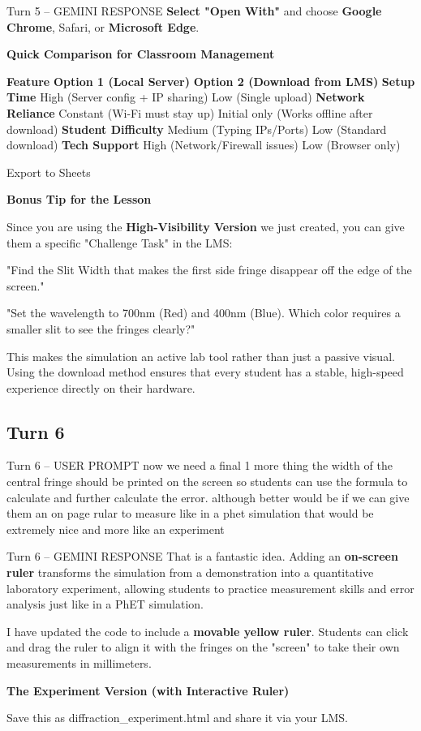 \documentclass[10pt,a4paper]{article}
\begin{document}
\begin{aibox}{Turn 5 -- GEMINI RESPONSE}
\textbf{Select "Open With"} and choose \textbf{Google Chrome}, Safari, or \textbf{Microsoft Edge}.

\textbf{\large Quick Comparison for Classroom Management}

\textbf{Feature}	\textbf{Option 1 (Local Server)}	\textbf{Option 2 (Download from LMS)}
\textbf{Setup Time}	High (Server config + IP sharing)	Low (Single upload)
\textbf{Network Reliance}	Constant (Wi-Fi must stay up)	Initial only (Works offline after download)
\textbf{Student Difficulty}	Medium (Typing IPs/Ports)	Low (Standard download)
\textbf{Tech Support}	High (Network/Firewall issues)	Low (Browser only)

Export to Sheets

\textbf{\large Bonus Tip for the Lesson}

Since you are using the \textbf{High-Visibility Version} we just created, you can give them a specific "Challenge Task" in the LMS:

"Find the Slit Width that makes the first side fringe disappear off the edge of the screen."

"Set the wavelength to 700nm (Red) and 400nm (Blue). Which color requires a smaller slit to see the fringes clearly?"

This makes the simulation an active lab tool rather than just a passive visual. Using the download method ensures that every student has a stable, high-speed experience directly on their hardware.
\end{aibox}


\subsection*{Turn 6}
\begin{userbox}{Turn 6 -- USER PROMPT}
now we need a final 1 more thing the width of the central fringe should be printed on the screen so students can use the formula to calculate and further calculate the error. although better would be if we can give them an on page rular to measure like in a phet simulation that would be extremely nice and more like an experiment
\end{userbox}

\begin{aibox}{Turn 6 -- GEMINI RESPONSE}
That is a fantastic idea. Adding an \textbf{on-screen ruler} transforms the simulation from a demonstration into a quantitative laboratory experiment, allowing students to practice measurement skills and error analysis just like in a PhET simulation.

I have updated the code to include a \textbf{movable yellow ruler}. Students can click and drag the ruler to align it with the fringes on the "screen" to take their own measurements in millimeters.

\textbf{\large The Experiment Version (with Interactive Ruler)}

Save this as diffraction\_experiment.html and share it via your LMS.

\end{aibox}
\end{document}
